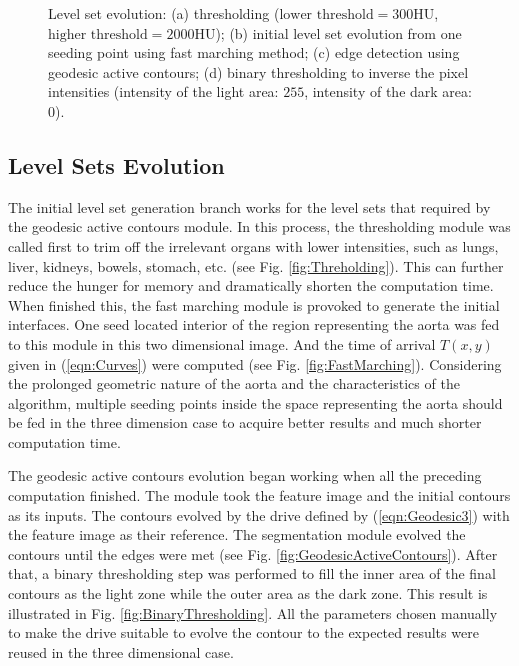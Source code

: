 \begin{figure}[htb]
{\label{fig:BinaryThresholding}}
\caption{Level set evolution: (a) thresholding ($\text{lower threshold} = 300\text{HU}$, $\text{higher threshold} = 2000\text{HU}$); (b) initial level set evolution from one seeding point using fast marching method; (c) edge detection using geodesic active contours; (d) binary thresholding to inverse the pixel intensities (intensity of the light area: $255$, intensity of the dark area: $0$).}
\label{fig:LevelSetEvolution}
\end{figure}

\subsection{Level Sets Evolution}
The initial level set generation branch works for the level sets that required by the geodesic active contours module.
In this process, the thresholding module was called first to trim off the irrelevant organs with lower intensities, such as lungs, liver, kidneys, bowels, stomach, etc. (see Fig. \ref{fig:Threholding}).
This can further reduce the hunger for memory and dramatically shorten the computation time.
When finished this, the fast marching module is provoked to generate the initial interfaces.
One seed located interior of the region representing the aorta was fed to this module in this two dimensional image.
And the time of arrival $T(x,y)$ given in (\ref{eqn:Curves}) were computed (see Fig. \ref{fig:FastMarching}).
Considering the prolonged geometric nature of the aorta and the characteristics of the algorithm, multiple seeding points inside the space representing the aorta should be fed in the three dimension case to acquire better results and much shorter computation time.

The geodesic active contours evolution began working when all the preceding computation finished.
The module took the feature image and the initial contours as its inputs.
The contours evolved by the drive defined by (\ref{eqn:Geodesic3}) with the feature image as their reference.
The segmentation module evolved the contours until the edges were met (see Fig. \ref{fig:GeodesicActiveContours}).
After that, a binary thresholding step was performed to fill the inner area of the final contours as the light zone while the outer area as the dark zone.
This result is illustrated in Fig. \ref{fig:BinaryThresholding}.
All the parameters chosen manually to make the drive suitable to evolve the contour to the expected results were reused in the three dimensional case.

